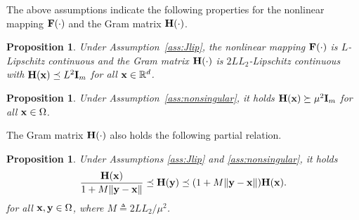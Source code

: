 \documentclass[11pt]{article}
\theoremstyle{plain}
\newtheorem{proposition}[theorem]{Proposition}
\theoremstyle{definition}
\theoremstyle{remark}
\theoremstyle{plain}
\newcommand{\Norm}[1]{\left\| #1 \right\|}
\def\mH {{\bf H}}
\def\F{{\bf F}}
\def\H{{\bf H}}
\def\I{{\bf I}}
\def \J{{\bf J}}
\def\x{{\bf x}}
\def\y{{\bf y}}
\def\RB{{\mathbb R}}
\begin{document}
The above assumptions indicate the following properties for the nonlinear mapping $\F(\cdot)$ and the Gram matrix $\H(\cdot)$.
\begin{proposition}
\label{prop:gram_lip}
    Under Assumption~\ref{ass:Jlip}, the nonlinear mapping $\F(\cdot)$ is $L$-Lipschitz continuous and the Gram matrix $\H(\cdot)$ is $2LL_2$-Lipschitz continuous with $\H(\x)\preceq L^2\I_m$ for all $\x\in\RB^{d}$.
\end{proposition}
\begin{proposition}
\label{prop:gram_lower}
    Under Assumption~\ref{ass:nonsingular}, it holds  $\H(\x)\succeq \mu^2\I_m$ for all $\x\in\Omega$.
\end{proposition}
The Gram matrix $\mH(\cdot)$ also holds the following partial relation.
\begin{proposition}
\label{prop:Gram_concor}
    Under Assumptions \ref{ass:Jlip} and \ref{ass:nonsingular}, it holds 
    \begin{align}
    \label{eq:Gram_bound_0}
        \frac{\H(\x)}{1+M\|\y-\x\|}\preceq\H(\y) \preceq (1+M\|\y-\x\|)\H(\x).
    \end{align}
    for all $\x,\y\in\Omega$, where  $M\triangleq2LL_2/\mu^2$.    
\end{proposition}
\end{document}
